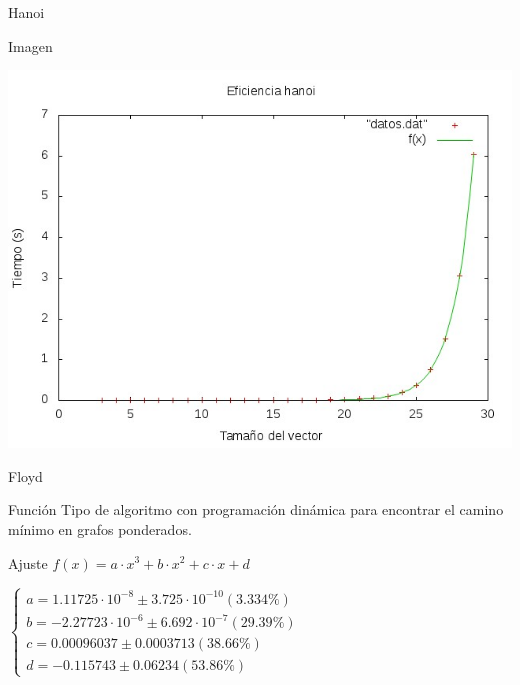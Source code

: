 \documentclass[compress]{beamer}
\begin{document}
\begin{frame}{Hanoi}
	\begin{alertblock}{Imagen}
	\begin{center}
	\includegraphics[scale=0.55]{../Graficas/Hanoi/hanoiO0_ruben.jpeg}
	\end{center}
	\end{alertblock}
\end{frame}




\begin{frame}{Floyd}
	\begin{block}{Función}
	Tipo de algoritmo con programación dinámica para encontrar el camino mínimo en grafos 		ponderados.
	\end{block}
	
	\begin{block}{Ajuste}
	$f(x) = a\cdot x^3 + b\cdot x^2 + c\cdot x + d $

	$\left\{ \begin{array}{c}
	a               = 1.11725\cdot 10^{-8}      \pm 3.725\cdot 10^{-10}    (3.334\%) \\
	b               = -2.27723\cdot 10^{-6}    \pm 6.692\cdot 10^{-7}    (29.39\%) \\
	c               = 0.00096037       \pm 0.0003713    (38.66\%) \\
	d               = -0.115743        \pm 0.06234      (53.86\%)
	\end{array}\right.$
	\end{block}
\end{frame}
\end{document}
